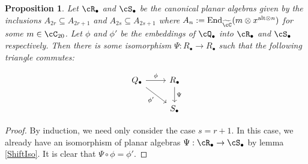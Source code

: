 \documentclass[11pt]{article}
\theoremstyle{plain}
\newtheorem{prop}[thm]{Proposition}
\theoremstyle{definition}
\DeclareMathOperator{\End}{End}
\newcommand{\alttens}[1][n]{{\text{alt}\otimes #1}}
\newcommand{\xalt}{x^{\alttens}}
\begin{document}
\begin{prop}
Let $\cR_{\bullet}$ and $\cS_{\bullet}$ be the canonical planar algebras given by the inclusions $A_{2r}\subseteq A_{2r+1}$ and $A_{2s}\subseteq A_{2s+1}$ where $A_n:=\End_{\widetilde{\cC}}(m\otimes \xalt)$ for some $m\in \cC_{20}$. Let $\phi$ and $\phi'$ be the embeddings of $\cQ_{\bullet}$ into $\cR_{\bullet}$ and $\cS_{\bullet}$ respectively. Then there is some isomorphism $\Psi:R_{\bullet}\rightarrow R_{\bullet}$ such that the following triangle commutes:

$$
  \begin{tikzcd}
    Q_{\bullet} \arrow{r}{\phi} \arrow[swap]{dr}{\phi'} & R_{\bullet} \arrow{d}{\Psi} \\
     & S_{\bullet}
  \end{tikzcd}
$$  
\end{prop}

\begin{proof}
By induction, we need only consider the case $s=r+1$. In this case, we already have an isomorphism of planar algebras $\Psi:\cR_{\bullet}\rightarrow \cS_{\bullet}$ by lemma \ref{ShiftIso}. It is clear that $\Psi\circ \phi=\phi'$.
\end{proof}


{\footnotesize{

}}
\end{document}
